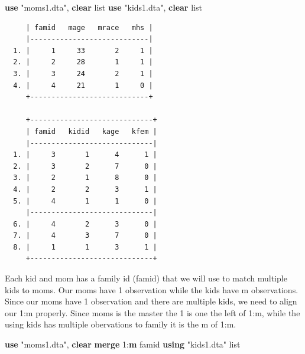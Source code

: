 \documentclass[
]{book}
\newenvironment{Shaded}{\begin{snugshade}}{\end{snugshade}}
\newcommand{\FunctionTok}[1]{\textcolor[rgb]{0.13,0.29,0.53}{\textbf{#1}}}
\newcommand{\KeywordTok}[1]{\textcolor[rgb]{0.13,0.29,0.53}{\textbf{#1}}}
\newcommand{\NormalTok}[1]{#1}
\newcommand{\OtherTok}[1]{\textcolor[rgb]{0.56,0.35,0.01}{#1}}
\newcommand{\StringTok}[1]{\textcolor[rgb]{0.31,0.60,0.02}{#1}}
\begin{document}
\begin{Shaded}
\begin{Highlighting}[]
\KeywordTok{use} \StringTok{"moms1.dta"}\NormalTok{, }\KeywordTok{clear}
\OtherTok{list}
\KeywordTok{use} \StringTok{"kids1.dta"}\NormalTok{, }\KeywordTok{clear}
\OtherTok{list}
\end{Highlighting}
\end{Shaded}

\begin{verbatim}
     | famid   mage   mrace   mhs |
     |----------------------------|
  1. |     1     33       2     1 |
  2. |     2     28       1     1 |
  3. |     3     24       2     1 |
  4. |     4     21       1     0 |
     +----------------------------+

     +-----------------------------+
     | famid   kidid   kage   kfem |
     |-----------------------------|
  1. |     3       1      4      1 |
  2. |     3       2      7      0 |
  3. |     2       1      8      0 |
  4. |     2       2      3      1 |
  5. |     4       1      1      0 |
     |-----------------------------|
  6. |     4       2      3      0 |
  7. |     4       3      7      0 |
  8. |     1       1      3      1 |
     +-----------------------------+
\end{verbatim}

Each kid and mom has a family id (famid) that we will use to match multiple kids to moms. Our moms have 1 observation while the kids have m observations. Since our moms have 1 observation and there are multiple kids, we need to align our 1:m properly. Since moms is the master the 1 is one the left of 1:m, while the using kids has multiple obervations to family it is the m of 1:m.

\begin{Shaded}
\begin{Highlighting}[]
\KeywordTok{use} \StringTok{"moms1.dta"}\NormalTok{, }\KeywordTok{clear}
\KeywordTok{merge}\NormalTok{ 1:}\FunctionTok{m}\NormalTok{ famid }\KeywordTok{using} \StringTok{"kids1.dta"}
\OtherTok{list}
\end{Highlighting}
\end{Shaded}
\end{document}
